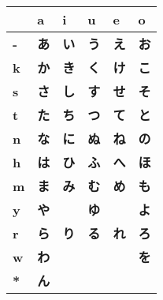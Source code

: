 


\bigskip
\begin{center}
\Huge

\begin{tabular}{m{1.0cm}||m{1.0cm}|m{1.0cm}|m{1.0cm}|m{1.0cm}|m{1.0cm}|}
& \textbf{a}& \textbf{i}& \textbf{u}& \textbf{e}& \textbf{o}\\ \hline \hline
\textbf{-}&\smallskip\textbf{あ}&\smallskip\textbf{い}&\smallskip\textbf{う}&\smallskip\textbf{え}&\smallskip\textbf{お}\\ \hline
\textbf{k}&\smallskip\textbf{か}&\smallskip\textbf{き}&\smallskip\textbf{く}&\smallskip\textbf{け}&\smallskip\textbf{こ}\\ \hline
\textbf{s}&\smallskip\textbf{さ}&\smallskip\textbf{し}&\smallskip\textbf{す}&\smallskip\textbf{せ}&\smallskip\textbf{そ}\\ \hline
\textbf{t}&\smallskip\textbf{た}&\smallskip\textbf{ち}&\smallskip\textbf{つ}&\smallskip\textbf{て}&\smallskip\textbf{と}\\ \hline
\textbf{n}&\smallskip\textbf{な}&\smallskip\textbf{に}&\smallskip\textbf{ぬ}&\smallskip\textbf{ね}&\smallskip\textbf{の}\\ \hline
\textbf{h}&\smallskip\textbf{は}&\smallskip\textbf{ひ}&\smallskip\textbf{ふ}&\smallskip\textbf{へ}&\smallskip\textbf{ほ}\\ \hline
\textbf{m}&\smallskip\textbf{ま}&\smallskip\textbf{み}&\smallskip\textbf{む}&\smallskip\textbf{め}&\smallskip\textbf{も}\\ \hline
\textbf{y}&\smallskip\textbf{や}&\smallskip   &\smallskip\textbf{ゆ}&\smallskip   &\smallskip\textbf{よ}\\ \hline
\textbf{r}&\smallskip\textbf{ら}&\smallskip\textbf{り}&\smallskip\textbf{る}&\smallskip\textbf{れ}&\smallskip\textbf{ろ}\\ \hline
\textbf{w}&\smallskip\textbf{わ}&\smallskip   &\smallskip   &\smallskip   &\smallskip\textbf{を}\\ \hline
\textbf{*}&\smallskip\textbf{ん}&\smallskip   &\smallskip   &\smallskip   &\smallskip   \\ \hline
\end{tabular}
\end{center}
